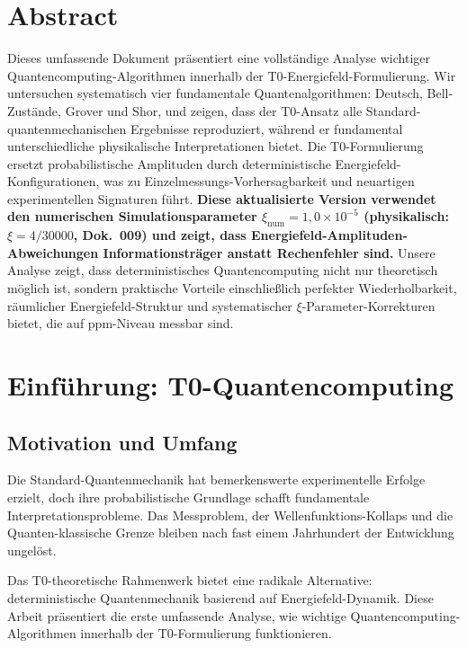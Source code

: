 \section*{Abstract}
		Dieses umfassende Dokument präsentiert eine vollständige Analyse wichtiger Quantencomputing-Algorithmen innerhalb der T0-Energiefeld-Formulierung. Wir untersuchen systematisch vier fundamentale Quantenalgorithmen: Deutsch, Bell-Zustände, Grover und Shor, und zeigen, dass der T0-Ansatz alle Standard-quantenmechanischen Ergebnisse reproduziert, während er fundamental unterschiedliche physikalische Interpretationen bietet. Die T0-Formulierung ersetzt probabilistische Amplituden durch deterministische Energiefeld-Konfigurationen, was zu Einzelmessungs-Vorhersagbarkeit und neuartigen experimentellen Signaturen führt. \textbf{Diese aktualisierte Version verwendet den numerischen Simulationsparameter $\xi_{\text{num}} = 1{,}0 \times 10^{-5}$ (physikalisch: $\xi = 4/30000$, Dok.~009) und zeigt, dass Energiefeld-Amplituden-Abweichungen Informationsträger anstatt Rechenfehler sind.} Unsere Analyse zeigt, dass deterministisches Quantencomputing nicht nur theoretisch möglich ist, sondern praktische Vorteile einschließlich perfekter Wiederholbarkeit, räumlicher Energiefeld-Struktur und systematischer $\xi$-Parameter-Korrekturen bietet, die auf ppm-Niveau messbar sind.

	
	
	\section{Einführung: T0-Quantencomputing}
	
	\subsection{Motivation und Umfang}
	
	Die Standard-Quantenmechanik hat bemerkenswerte experimentelle Erfolge erzielt, doch ihre probabilistische Grundlage schafft fundamentale Interpretationsprobleme. Das Messproblem, der Wellenfunktions-Kollaps und die Quanten-klassische Grenze bleiben nach fast einem Jahrhundert der Entwicklung ungelöst.
	
	Das T0-theoretische Rahmenwerk bietet eine radikale Alternative: deterministische Quantenmechanik basierend auf Energiefeld-Dynamik. Diese Arbeit präsentiert die erste umfassende Analyse, wie wichtige Quantencomputing-Algorithmen innerhalb der T0-Formulierung funktionieren.
	
